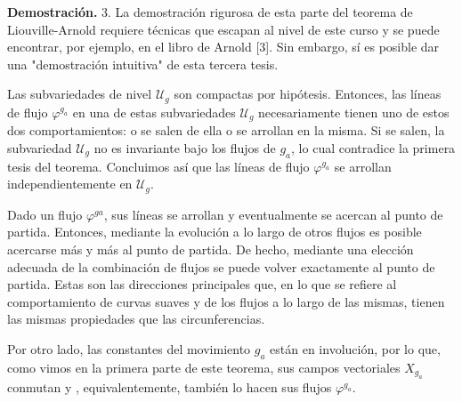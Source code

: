 
\textbf{Demostración.}
3. La demostración rigurosa de esta parte del teorema de Liouville-Arnold requiere técnicas que escapan al nivel de este curso y se puede encontrar, por ejemplo, en el libro de Arnold [3]. Sin embargo, sí es posible dar una "demostración intuitiva" de esta tercera tesis.

Las subvariedades de nivel $\mathscr{U}_{g}$ son compactas por hipótesis. Entonces, las líneas de flujo $\varphi^{g_{a}}$ en una de estas subvariedades $\mathscr{U}_{g}$ necesariamente tienen uno de estos dos comportamientos: o se salen de ella o se arrollan en la misma. Si se salen, la subvariedad $\mathscr{U}_{g}$ no es invariante bajo los flujos de $g_{a}$, lo cual contradice la primera tesis del teorema. Concluimos así que las líneas de flujo $\varphi^{g_{a}}$ se arrollan independientemente en $\mathscr{U}_{g}$.

Dado un flujo $\varphi^{g a}$, sus líneas se arrollan y eventualmente se acercan al punto de partida. Entonces, mediante la evolución a lo largo de otros flujos es posible acercarse más y más al punto de partida. De hecho, mediante una elección adecuada de la combinación de flujos se puede volver exactamente al punto de partida. Estas son las direcciones principales que, en lo que se refiere al comportamiento de curvas suaves y de los flujos a lo largo de las mismas, tienen las mismas propiedades que las circunferencias.

Por otro lado, las constantes del movimiento $g_{a}$ están en involución, por lo que, como vimos en la primera parte de este teorema, sus campos vectoriales $X_{g_{a}}$ conmutan y , equivalentemente, también lo hacen sus flujos $\varphi^{g_{a}}$.

